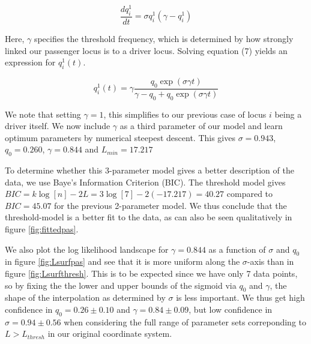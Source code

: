 \documentclass{article}
\begin{document}
\begin{equation}
\dfrac{dq_i^1}{dt}=\sigma q_i^1 (\gamma-q_i^1)
\end{equation}

Here, $\gamma$ specifies the threshold frequency, which is determined by how strongly linked our passenger locus is to a driver locus. Solving equation (7) yields an expression for $q_i^1(t)$.

\begin{equation}
q_i^1(t) = \gamma \dfrac{q_0 \exp{(\sigma \gamma t)}}{\gamma-q_0+q_0 \exp{(\sigma \gamma t)}}
\end{equation}

We note that setting $\gamma=1$, this simplifies to our previous case of locus $i$ being a driver itself.
We now include $\gamma$ as a third parameter of our model and learn optimum parameters by numerical steepest descent. This gives $\sigma = 0.943$, $q_0 = 0.260$, $\gamma = 0.844$ and $L_{min} = 17.217$

To determine whether this 3-parameter model gives a better description of the data, we use Baye's Information Criterion (BIC). The threshold model gives $BIC = k\log{[n]}-2L = 3\log{[7]} - 2(-17.217) = 40.27$ compared to $BIC = 45.07$ for the previous 2-parameter model. We thus conclude that the threshold-model is a better fit to the data, as can also be seen qualitatively in figure \ref{fig:fittedpas}.

We also plot the log likelihood landscape for $\gamma = 0.844$ as a function of $\sigma$ and $q_0$ in figure \ref{fig:Lsurfpas} and see that it is more uniform along the $\sigma$-axis than in figure \ref{fig:Lsurfthresh}. This is to be expected since we have only 7 data points, so by fixing the the lower and upper bounds of the sigmoid via $q_0$ and $\gamma$, the shape of the interpolation as determined by $\sigma$ is less important. We thus get high confidence in $q_0=0.26 \pm 0.10$ and $\gamma = 0.84 \pm 0.09$, but low confidence in $\sigma = 0.94 \pm 0.56$ when considering the full range of parameter sets correponding to $L > L_{thresh}$ in our original coordinate system.
\end{document}
